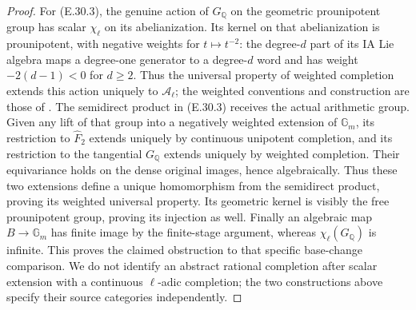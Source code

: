 \begin{proof}
For (E.30.3), the genuine action of $G_{\mathbb Q}$ on the
geometric prounipotent group has scalar $\chi_\ell$ on its
abelianization. Its kernel on that abelianization is prounipotent,
with negative weights for $t\mapsto t^{-2}$: the degree-$d$
part of its IA Lie algebra maps a degree-one generator to a
degree-$d$ word and has weight $-2(d-1)<0$ for $d\geq2$.
Thus the universal
property of weighted completion extends this action uniquely to
$\mathcal A_\ell$; the weighted conventions and construction are
those of \cite[\S\S2--4]{E_HainMatsumoto}.
The semidirect product in (E.30.3) receives the actual arithmetic
group. Given any lift of that group into a negatively weighted
extension of $\mathbb G_m$, its restriction to $\widehat F_2$
extends uniquely by continuous unipotent completion, and its
restriction to the tangential $G_{\mathbb Q}$ extends uniquely by
weighted completion. Their equivariance holds on the dense
original images, hence algebraically. Thus these two extensions
define a unique homomorphism from the semidirect product, proving
its weighted universal property. Its geometric kernel is visibly
the free prounipotent group, proving its injection as well.
Finally an algebraic map $B\to\mathbb G_m$ has finite image by
the finite-stage argument, whereas $\chi_\ell(G_{\mathbb Q})$
is infinite. This proves the claimed obstruction to that
specific base-change comparison. We do not identify an abstract
rational completion after scalar extension with a continuous
$\ell$-adic completion; the two constructions above specify
their source categories independently.
\end{proof}

